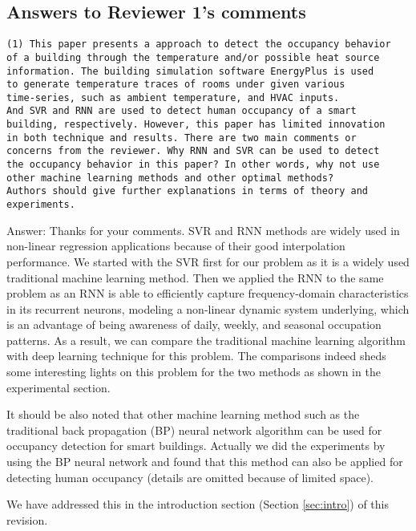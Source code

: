 \subsection{Answers to Reviewer 1's comments}
\begin{verbatim}
(1) This paper presents a approach to detect the occupancy behavior
of a building through the temperature and/or possible heat source
information. The building simulation software EnergyPlus is used
to generate temperature traces of rooms under given various
time-series, such as ambient temperature, and HVAC inputs.
And SVR and RNN are used to detect human occupancy of a smart
building, respectively. However, this paper has limited innovation
in both technique and results. There are two main comments or
concerns from the reviewer. Why RNN and SVR can be used to detect
the occupancy behavior in this paper? In other words, why not use
other machine learning methods and other optimal methods?
Authors should give further explanations in terms of theory and
experiments.
\end{verbatim}

Answer: Thanks for your comments. SVR and RNN methods are widely used
in non-linear regression applications because of their good
interpolation performance.  We started with the SVR first for our
problem as it is a widely used traditional machine learning
method. Then we applied the RNN to the same problem as an RNN is able
to efficiently capture frequency-domain characteristics in its
recurrent neurons, modeling a non-linear dynamic system underlying,
which is an advantage of being awareness of daily, weekly, and
seasonal occupation patterns.  As a result, we can compare the
traditional machine learning algorithm with deep learning technique
for this problem. The comparisons indeed sheds some interesting lights
on this problem for the two methods as shown in the experimental section.

It should be also noted that other machine learning method such as the
traditional back propagation (BP) neural network algorithm can be used
for occupancy detection for smart buildings. Actually we did the
experiments by using the BP neural network and found that this method
can also be applied for detecting human occupancy (details are omitted
because of limited space).

We have addressed this in the introduction section (Section
\ref{sec:intro}) of this revision.

